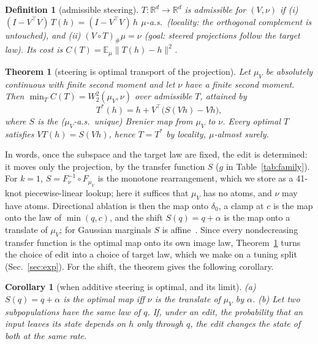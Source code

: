 \documentclass{article}
\newtheorem{theorem}{Theorem}
\newtheorem{corollary}{Corollary}
\newtheorem{definition}{Definition}
\newcommand{\Wtwo}{W_2}
\begin{document}
\begin{definition}[admissible steering]
\label{def:local}
$T:\mathbb{R}^d\to\mathbb{R}^d$ is admissible for $(V,\nu)$ if
(i) $(I-V^\top V)\,T(h)=(I-V^\top V)\,h$ $\mu$-a.s.\ (\emph{locality}: the
orthogonal complement is untouched), and (ii) $(V\!\circ T)_{\#}\mu=\nu$
(\emph{goal}: steered projections follow the target law). Its cost is
$C(T)=\mathbb{E}_\mu\lVert T(h)-h\rVert^2$.
\end{definition}

\begin{theorem}[steering is optimal transport of the projection]
\label{thm:ot}
Let $\mu_V$ be absolutely continuous with finite second moment and let $\nu$
have a finite second moment. Then $\min_T C(T)=\Wtwo^2(\mu_V,\nu)$ over
admissible $T$, attained by
\begin{equation}
T^*(h)=h+V^\top\big(S(Vh)-Vh\big),
\label{eq:edit}
\end{equation}
where $S$ is the ($\mu_V$-a.s.\ unique) Brenier map from $\mu_V$ to $\nu$.
Every optimal $T$ satisfies $VT(h)=S(Vh)$, hence $T=T^*$ by locality,
$\mu$-almost surely.
\end{theorem}

In words, once the subspace and the target law are fixed, the edit is
determined: it moves only the projection, by the transfer function $S$ ($g$ in
Table~\ref{tab:family}). For $k=1$, $S=F_\nu^{-1}\circ F_{\mu_V}$ is the
monotone rearrangement, which we store as a 41-knot piecewise-linear lookup;
here it suffices that $\mu_V$ has no atoms, and $\nu$ may have atoms.
Directional ablation is then the map onto $\delta_0$, a clamp at $c$ is the map
onto the law of $\min(q,c)$, and the shift $S(q)=q+\alpha$ is the map onto a
translate of $\mu_V$; for Gaussian marginals $S$ is
affine~\citep{knott1984optimal,gelbrich1990formula}. Since every nondecreasing
transfer function is the optimal map onto its own image law,
Theorem~\ref{thm:ot} turns the choice of edit into a choice of target law,
which we make on a tuning split (Sec.~\ref{sec:exp}). For the shift, the
theorem gives the following corollary.

\begin{corollary}[when additive steering is optimal, and its limit]
\label{cor:additive}
(a) $S(q)=q+\alpha$ is the optimal map iff $\nu$ is the translate of $\mu_V$
by $\alpha$.
(b) Let two subpopulations have the same law of $q$. If, under an edit, the
probability that an input leaves its state depends on $h$ only through $q$,
the edit changes the state of both at the same rate.
\end{corollary}
\end{document}
